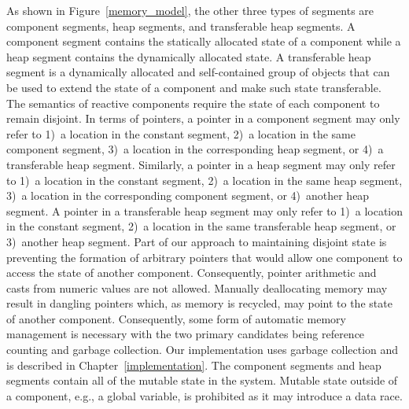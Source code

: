 As shown in Figure~\ref{memory_model}, the other three types of segments are component segments, heap segments, and transferable heap segments.
A component segment contains the statically allocated state of a component while a heap segment contains the dynamically allocated state.
A transferable heap segment is a dynamically allocated and self-contained group of objects that can be used to extend the state of a component and make such state transferable.
The semantics of reactive components require the state of each component to remain disjoint.
In terms of pointers, a pointer in a component segment may only refer to 1)~a location in the constant segment, 2)~a location in the same component segment, 3)~a location in the corresponding heap segment, or 4)~a transferable heap segment.
Similarly, a pointer in a heap segment may only refer to 1)~a location in the constant segment, 2)~a location in the same heap segment, 3)~a location in the corresponding component segment, or 4)~another heap segment.
A pointer in a transferable heap segment may only refer to 1)~a location in the constant segment, 2)~a location in the same transferable heap segment, or 3)~another heap segment.
Part of our approach to maintaining disjoint state is preventing the formation of arbitrary pointers that would allow one component to access the state of another component.
Consequently, pointer arithmetic and casts from numeric values are not allowed.
Manually deallocating memory may result in dangling pointers which, as memory is recycled, may point to the state of another component.
Consequently, some form of automatic memory management is necessary with the two primary candidates being reference counting and garbage collection.
Our implementation uses garbage collection and is described in Chapter~\ref{implementation}.
The component segments and heap segments contain all of the mutable state in the system.
Mutable state outside of a component, e.g., a global variable, is prohibited as it may introduce a data race.

